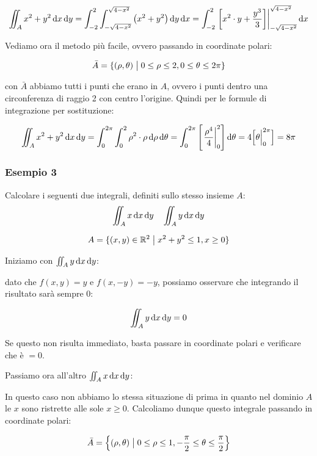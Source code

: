 \[
    \iint_A {x^{2}+y^{2}} \mathop{}\!\mathrm{d}{x}\mathop{}\!\mathrm{d}{y} = \int_{-2}^{2} \int_{-\sqrt{4-x^{2}}}^{\sqrt{4-x^{2}}} {\left(x^{2} + y^{2}\right)} \mathop{}\!\mathrm{d}{y}\mathop{}\!\mathrm{d}{x}  = \int_{-2}^{2} { \left.\left[ x^{2} \cdot y + \frac{y^{3}}{3} \right]\right\rvert_{-\sqrt{4-x^{2}}}^{\sqrt{4-x^{2}}} \mathop{}\!\mathrm{d}{x}}
\]

Vediamo ora il metodo più facile, ovvero passando in coordinate polari:

\[
    \bar{A}  = \{(\rho,\theta) \;\big|\; 0 \le \rho \le 2, 0 \le \theta \le 2\pi \}
\]

con \(\bar{A}\) abbiamo tutti i punti che erano in \(A\), ovvero i punti dentro una circonferenza di raggio 2 con centro l'origine. Quindi per le formule di integrazione per sostituzione:

\[
    \iint_A x^{2}+y^{2} \mathop{}\!\mathrm{d}{x}\mathop{}\!\mathrm{d}{y} = \int_{0}^{2\pi} \int_{0}^{2} \rho^{2}\cdot\rho \mathop{}\!\mathrm{d}{\rho}\mathop{}\!\mathrm{d}{\theta} = \int_{0}^{2\pi} \left[ \left.\frac{\rho^4}{4}\right\rvert_{0}^{2} \right] \mathop{}\!\mathrm{d}{\theta} = 4 \Big[\theta\Big|_{0}^{2\pi}\Big] = 8\pi
\]

\pagebreak
\subsubsection*{Esempio 3}

Calcolare i seguenti due integrali, definiti sullo stesso insieme \(A\):
\[
    \iint_A x \mathop{}\!\mathrm{d}{x}\mathop{}\!\mathrm{d}{y} \quad \iint_A y \mathop{}\!\mathrm{d}{x}\mathop{}\!\mathrm{d}{y}
\]

\[
    A = \{ (x,y) \in \mathbb{R}^2 \;\big|\; x^{2}+y^{2} \le 1, x \ge 0 \}
\]

Iniziamo con \(\iint_A y \mathop{}\!\mathrm{d}{x}\mathop{}\!\mathrm{d}{y}\):

dato che \(f(x,y) = y\) e \(f(x,-y) = -y\), possiamo osservare che integrando il risultato sarà sempre 0:

\[
    \iint_A y \mathop{}\!\mathrm{d}{x}\mathop{}\!\mathrm{d}{y} = 0
\]

Se questo non risulta immediato, basta passare in coordinate polari e verificare che è \(=0\).

Passiamo ora all'altro \(\iint_A x \mathop{}\!\mathrm{d}{x}\mathop{}\!\mathrm{d}{y}\):

In questo caso non abbiamo lo stessa situazione di prima in quanto nel dominio \(A\) le \(x\) sono ristrette alle sole \(x \ge 0\). Calcoliamo dunque questo integrale passando in coordinate polari:

\[
    \bar{A} = \left\{ (\rho,\theta) \;\big|\; 0 \le \rho \le 1, - \frac{\pi}{2} \le \theta \le \frac{\pi}{2} \right\}
\]

